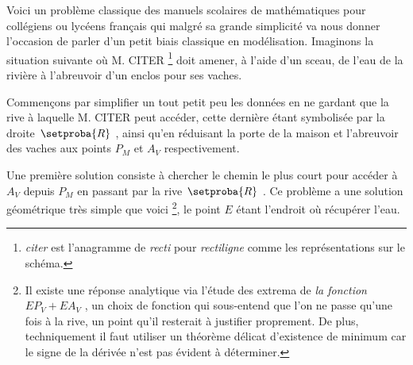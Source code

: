 Voici un problème classique des manuels scolaires de mathématiques pour collégiens ou lycéens français qui malgré sa grande simplicité va nous donner l'occasion de parler d'un petit biais classique en modélisation. Imaginons la situation suivante où M. CITER
\footnote{
	\emph{\og citer \fg} est l'anagramme de \emph{\og recti \fg} pour \emph{\og rectiligne \fg} comme les représentations sur le schéma.
}
doit amener, à l'aide d'un sceau, de l'eau de la rivière à l'abreuvoir d'un enclos pour ses vaches.

\smallskip
\begin{center}
\end{center}


\medskip


Commençons par simplifier un tout petit peu les données en ne gardant que la rive à laquelle M. CITER peut accéder, cette dernière étant symbolisée par la droite $\setproba{R}$ , ainsi qu'en réduisant la porte de la maison et l'abreuvoir des vaches aux points $P_M$ et $A_V$ respectivement. 

\smallskip
\begin{center}
\end{center}


\medskip


Une première solution consiste à chercher le chemin le plus court pour accéder à $A_V$ depuis $P_M$ en passant par la rive $\setproba{R}$ .
Ce problème a une solution géométrique très simple que voici
\footnote{
	Il existe une réponse analytique via l'étude des extrema de \emph{\og la fonction \fg} $E P_V + E A_V$ , un choix de fonction qui sous-entend que l'on ne passe qu'une fois à la rive, un point qu'il resterait à justifier proprement.
	De plus, techniquement il faut utiliser un théorème délicat d'existence de minimum car le signe de la dérivée n'est pas évident à déterminer. 
},
le point $E$ étant l'endroit où récupérer l'eau.

